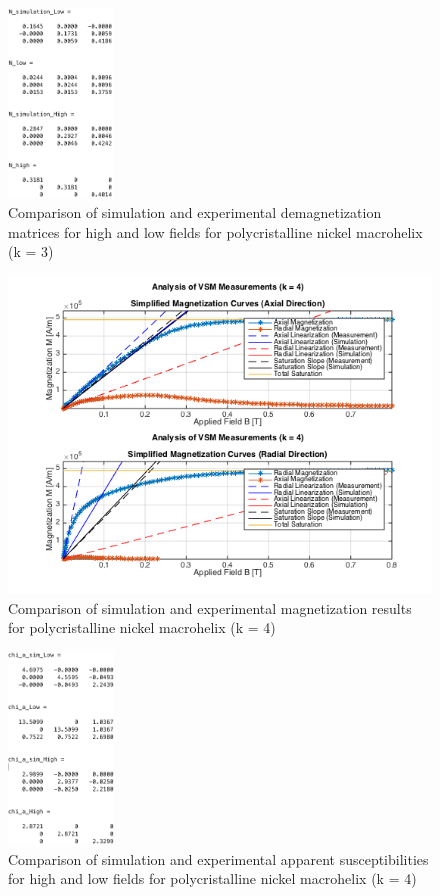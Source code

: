 \begin{figure}[h]
	\centering
  \includegraphics[width=0.25\textwidth]{Pictures/ExperimentalAssessk3N.png}
	\caption{Comparison of simulation and experimental demagnetization matrices for high and low fields for polycristalline nickel macrohelix (k = 3)}
	\label{fig:ExperimentalAssessk3N}
\end{figure}


\begin{figure}[h]
	\centering
  \includegraphics[width=1\textwidth]{Pictures/ExperimentalAssessk4.png}
	\caption{Comparison of simulation and experimental magnetization results for polycristalline nickel macrohelix (k = 4)}
	\label{fig:ExperimentalAssessk4}
\end{figure}

\begin{figure}[h]
	\centering
  \includegraphics[width=0.25\textwidth]{Pictures/ExperimentalAssessk4chi.png}
	\caption{Comparison of simulation and experimental apparent susceptibilities for high and low fields for polycristalline nickel macrohelix (k = 4)}
	\label{fig:ExperimentalAssessk4chi}
\end{figure}

